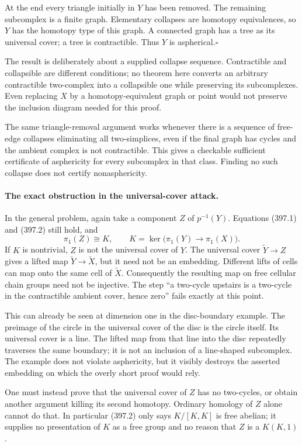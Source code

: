 \documentclass[11pt]{article}
\begin{document}
At the end every triangle initially in $Y$ has been removed. The
remaining subcomplex is a finite graph. Elementary collapses are homotopy
equivalences, so $Y$ has the homotopy type of this graph.
A connected graph has a tree as its universal cover; a tree is
contractible. Thus $Y$ is aspherical.\hfill$\square$

The result is deliberately about a supplied collapse sequence. Contractible
and collapsible are different conditions; no theorem here converts an
arbitrary contractible two-complex into a collapsible one while preserving
its subcomplexes. Even replacing $X$ by a homotopy-equivalent graph or
point would not preserve the inclusion diagram needed for this proof.

The same triangle-removal argument works whenever there is a sequence
of free-edge collapses eliminating all two-simplices, even if the final
graph has cycles and the ambient complex is not contractible. This gives
a checkable sufficient certificate of asphericity for every subcomplex
in that class. Finding no such collapse does not certify nonasphericity.

\paragraph{The exact obstruction in the universal-cover attack.}
In the general problem, again take a component $Z$ of $p^{-1}(Y)$.
Equations (397.1) and (397.2) still hold, and
\[
 \pi_1(Z)\cong K,
 \qquad K=\ker\bigl(\pi_1(Y)\to\pi_1(X)\bigr).
\]
If $K$ is nontrivial, $Z$ is not the universal cover of $Y$.
The universal cover $\widetilde Y\to Z$ gives a lifted map
$\widetilde Y\to\widetilde X$, but it need not be an embedding.
Different lifts of cells can map onto the same cell of $\widetilde X$.
Consequently the resulting map on free cellular chain groups need not
be injective. The step ``a two-cycle upstairs is a two-cycle in the
contractible ambient cover, hence zero'' fails exactly at this point.

This can already be seen at dimension one in the disc-boundary example.
The preimage of the circle in the universal cover of the disc is the
circle itself. Its universal cover is a line. The lifted map from that
line into the disc repeatedly traverses the same boundary; it is not an
inclusion of a line-shaped subcomplex. The example does not violate
asphericity, but it visibly destroys the asserted embedding on which
the overly short proof would rely.

One must instead prove that the universal cover of $Z$ has no two-cycles,
or obtain another argument killing its second homotopy. Ordinary
homology of $Z$ alone cannot do that. In particular (397.2) only says
$K/[K,K]$ is free abelian; it supplies no presentation of $K$ as a free
group and no reason that $Z$ is a $K(K,1)$.
\end{document}
